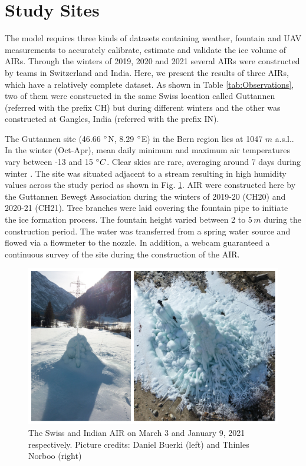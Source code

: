 \documentclass[utf8]{frontiersSCNS}
\begin{document}
\section{Study Sites}

The model requires three kinds of datasets containing weather, fountain and UAV measurements to accurately
calibrate, estimate and validate the ice volume of AIRs. Through the winters of 2019, 2020 and 2021 several AIRs
were constructed by teams in Switzerland and India. Here, we present the results of three AIRs, which have a
relatively complete dataset. As shown in Table \ref{tab:Observations}, two of them were constructed in the same
Swiss location called Guttannen (referred with the prefix CH) but during different winters and the other was
constructed at Gangles, India (referred with the prefix IN).

The Guttannen site (46.66 $\degree$N, 8.29 $\degree$E) in the Bern region lies at 1047 $m$ a.s.l.. In the winter
(Oct-Apr), mean daily minimum and maximum air temperatures vary between -13 and 15 $\degree C$. Clear skies are
rare, averaging around 7 days during winter \citep{guttannen}. The site was situated adjacent to a stream
resulting in high humidity values across the study period as shown in Fig. \ref{fig:2AIR}. AIR were constructed
here by the Guttannen Bewegt Association during the winters of 2019-20 (CH20) and 2020-21 (CH21). Tree branches
were laid covering the fountain pipe to initiate the ice formation process. The fountain height varied between 2
to 5\,$m$ during the construction period. The water was transferred from a spring water source and flowed via a
flowmeter to the nozzle. In addition, a webcam guaranteed a continuous survey of the site during the
construction of the AIR.

\begin{figure}
	\begin{center}
		\includegraphics[width=12 cm]{Figures/Figure_2.jpg}
	\end{center}
	\caption{The Swiss and Indian AIR on March 3 and January 9, 2021 respectively. Picture credits: Daniel Buerki (left)
		and Thinles Norboo (right)}
	\label{fig:2AIR}
\end{figure}
\end{document}
